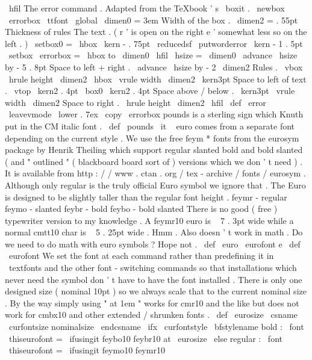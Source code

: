 {{{{{{\
hfil
}
}
%
The
error
{
}
command
.
%
Adapted
from
the
TeXbook
'
s
\
boxit
.
%
\
newbox
\
errorbox
%
{
\
ttfont
\
global
\
dimen0
=
3em
}
%
Width
of
the
box
.
\
dimen2
=
.
55pt
%
Thickness
of
rules
%
The
text
.
(
r
'
is
open
on
the
right
e
'
somewhat
less
so
on
the
left
.
)
\
setbox0
=
\
hbox
{
\
kern
-
.
75pt
\
reducedsf
\
putworderror
\
kern
-
1
.
5pt
}
%
\
setbox
\
errorbox
=
\
hbox
to
\
dimen0
{
\
hfil
\
hsize
=
\
dimen0
\
advance
\
hsize
by
-
5
.
8pt
%
Space
to
left
+
right
.
\
advance
\
hsize
by
-
2
\
dimen2
%
Rules
.
\
vbox
{
%
\
hrule
height
\
dimen2
\
hbox
{
\
vrule
width
\
dimen2
\
kern3pt
%
Space
to
left
of
text
.
\
vtop
{
\
kern2
.
4pt
\
box0
\
kern2
.
4pt
}
%
Space
above
/
below
.
\
kern3pt
\
vrule
width
\
dimen2
}
%
Space
to
right
.
\
hrule
height
\
dimen2
}
\
hfil
}
%
\
def
\
error
{
\
leavevmode
\
lower
.
7ex
\
copy
\
errorbox
}
%
pounds
{
}
is
a
sterling
sign
which
Knuth
put
in
the
CM
italic
font
.
%
\
def
\
pounds
{
{
\
it
\
}
}
%
euro
{
}
comes
from
a
separate
font
depending
on
the
current
style
.
%
We
use
the
free
feym
*
fonts
from
the
eurosym
package
by
Henrik
%
Theiling
which
support
regular
slanted
bold
and
bold
slanted
(
and
%
"
outlined
"
(
blackboard
board
sort
of
)
versions
which
we
don
'
t
need
)
.
%
It
is
available
from
http
:
/
/
www
.
ctan
.
org
/
tex
-
archive
/
fonts
/
eurosym
.
%
%
Although
only
regular
is
the
truly
official
Euro
symbol
we
ignore
%
that
.
The
Euro
is
designed
to
be
slightly
taller
than
the
regular
%
font
height
.
%
%
feymr
-
regular
%
feymo
-
slanted
%
feybr
-
bold
%
feybo
-
bold
slanted
%
%
There
is
no
good
(
free
)
typewriter
version
to
my
knowledge
.
%
A
feymr10
euro
is
~
7
.
3pt
wide
while
a
normal
cmtt10
char
is
~
5
.
25pt
wide
.
%
Hmm
.
%
%
Also
doesn
'
t
work
in
math
.
Do
we
need
to
do
math
with
euro
symbols
?
%
Hope
not
.
%
%
\
def
\
euro
{
{
\
eurofont
e
}
}
\
def
\
eurofont
{
%
%
We
set
the
font
at
each
command
rather
than
predefining
it
in
%
\
textfonts
and
the
other
font
-
switching
commands
so
that
%
installations
which
never
need
the
symbol
don
'
t
have
to
have
the
%
font
installed
.
%
%
There
is
only
one
designed
size
(
nominal
10pt
)
so
we
always
scale
%
that
to
the
current
nominal
size
.
%
%
By
the
way
simply
using
"
at
1em
"
works
for
cmr10
and
the
like
but
%
does
not
work
for
cmbx10
and
other
extended
/
shrunken
fonts
.
%
\
def
\
eurosize
{
\
csname
\
curfontsize
nominalsize
\
endcsname
}
%
%
\
ifx
\
curfontstyle
\
bfstylename
%
bold
:
\
font
\
thiseurofont
=
\
ifusingit
{
feybo10
}
{
feybr10
}
at
\
eurosize
\
else
%
regular
:
\
font
\
thiseurofont
=
\
ifusingit
{
feymo10
}
{
feymr10
}}}}}}
